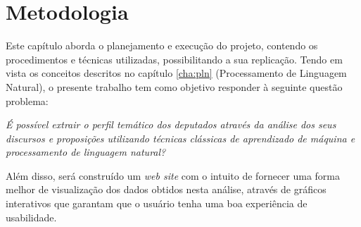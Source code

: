 \chapter{Metodologia}

Este capítulo aborda o planejamento e execução do projeto, contendo os procedimentos e técnicas utilizadas, possibilitando a sua  replicação. Tendo em vista os conceitos descritos no capítulo \ref{cha:pln} (Processamento de Linguagem Natural), o presente trabalho tem como objetivo responder à seguinte questão problema:

\begin{center}
\textit{É possível extrair o perfil temático dos deputados através da análise dos seus discursos e proposições utilizando técnicas clássicas de aprendizado de máquina e processamento de linguagem natural?}
\end{center}

Além disso, será construído um \textit{web site} com o intuito de fornecer uma forma melhor de visualização dos dados obtidos nesta análise, através de gráficos interativos que garantam que o usuário tenha uma boa experiência de usabilidade.




